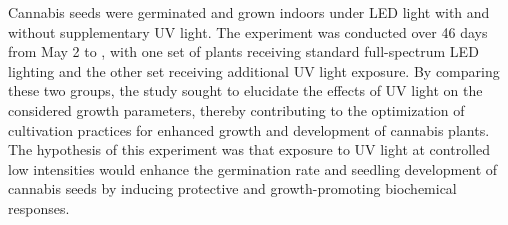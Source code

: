 Cannabis seeds were germinated and grown indoors under LED light with and without supplementary UV light. The experiment was conducted over \num[mode=text]{46} days from May 2 to , with one set of plants receiving standard full-spectrum LED lighting and the other set receiving additional UV light exposure. By comparing these two groups, the study sought to elucidate the effects of UV light on the considered growth parameters, thereby contributing to the optimization of cultivation practices for enhanced growth and development of cannabis plants. The hypothesis of this experiment was that exposure to UV light at controlled low intensities would enhance the germination rate and seedling development of cannabis seeds by inducing protective and growth-promoting biochemical responses.

